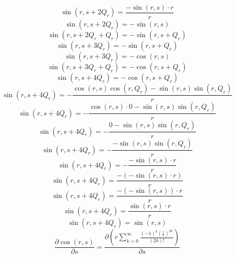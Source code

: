 \documentclass[a4paper,12pt]{report}
\begin{document}
\begin{equation}
\sin(r,s + 2Q_r) = \frac{-\sin(r,s) \cdot r}{r}
\end{equation}
\begin{equation}
\sin(r,s + 2Q_r) = -\sin(r,s)
\end{equation}
\begin{equation}
\sin(r,s + 2Q_r + Q_r) = -\sin(r,s + Q_r)
\end{equation}
\begin{equation}
\sin(r,s + 3Q_r) = -\sin(r,s + Q_r)
\end{equation}
\begin{equation}
\sin(r,s + 3Q_r) = -\cos(r,s)
\end{equation}
\begin{equation}
\sin(r,s + 3Q_r + Q_r) = -\cos(r,s + Q_r)
\end{equation}
\begin{equation}
\sin(r,s + 4Q_r) = -\cos(r,s + Q_r)
\end{equation}
\begin{equation}
\sin(r,s + 4Q_r) = -\frac{\cos(r,s) \cos(r,Q_r) - \sin(r,s) \sin(r,Q_r)}{r}
\end{equation}
\begin{equation}
\sin(r,s + 4Q_r) = -\frac{\cos(r,s) \cdot 0 - \sin(r,s) \sin(r,Q_r)}{r}
\end{equation}
\begin{equation}
\sin(r,s + 4Q_r) = -\frac{0 - \sin(r,s) \sin(r,Q_r)}{r}
\end{equation}
\begin{equation}
\sin(r,s + 4Q_r) = -\frac{-\sin(r,s) \sin(r,Q_r)}{r}
\end{equation}
\begin{equation}
\sin(r,s + 4Q_r) = -\frac{-\sin(r,s) \cdot r}{r}
\end{equation}
\begin{equation}
\sin(r,s + 4Q_r) = \frac{-(-\sin(r,s) \cdot r)}{r}
\end{equation}
\begin{equation}
\sin(r,s + 4Q_r) = \frac{-(-\sin(r,s)) \cdot r}{r}
\end{equation}
\begin{equation}
\sin(r,s + 4Q_r) = \frac{\sin(r,s) \cdot r}{r}
\end{equation}
\begin{equation}
\sin(r,s + 4Q_r) = \sin(r,s)
\end{equation}
\begin{equation}
\frac{\partial \cos(r,s)}{\partial s} = \frac{\partial \left(r \sum \limits_{k=0}^{\infty} \frac{(-1)^k \left(\frac{s}{r}\right)^{2k}}{(2k)!}\right)}{\partial s}
\end{equation}
\end{document}
